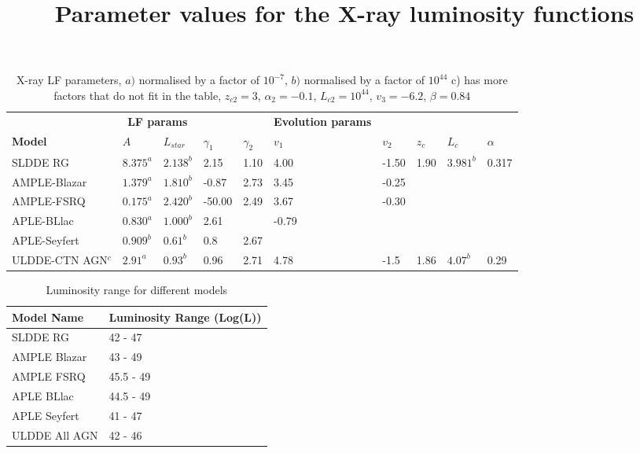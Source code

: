 \documentclass{article}
\begin{document}
\begin{table}
\centering
\title{Parameter values for the X-ray luminosity functions}
\begin{tabularx}{\textwidth}{|l|XXXX|XXXXX|}
\hline

& \multicolumn{2}{c}{\textbf{LF params}} &&&  \textbf{Evolution params} &&&&\\

\textbf{Model} & $A$ & $L_{star}$ & $\gamma _1$ &  $\gamma _2$  & $v_1$ & $v_2$ & $z_c$ & $L_c$ & $ \alpha$\\
\hline
SLDDE RG & $8.375^a$ & $2.138^b$ & 2.15 & 1.10 & 4.00 & -1.50 & 1.90 & $3.981^b$ & 0.317  \\

AMPLE-Blazar & $1.379^a$ & $1.810^b$ & -0.87 & 2.73 & 3.45 & -0.25 & & &  \\

AMPLE-FSRQ & $0.175^a$ & $2.420^b$ & -50.00 & 2.49 & 3.67 & -0.30 & & &  \\

APLE-BLlac & $0.830^a$& $1.000^b$ & 2.61 & &-0.79& & & &  \\
APLE-Seyfert & $0.909^b$ & $0.61^b$ & 0.8 & 2.67& & & & &  \\
ULDDE-CTN AGN$^c$ & $2.91^a$ & $0.93^b$ & 0.96 & 2.71& 4.78 &-1.5 &1.86 &$4.07^b$ &0.29  \\
\hline
\end{tabularx}
\caption{X-ray LF parameters, $a)$ normalised by a factor of $10^{-7}$, $b)$ normalised by a factor of $10^{44}$
c) has more factors that do not fit in the table, $z_{c2} = 3$, $\alpha_2 =-0.1$, $L_{c2} = 10^{44}$, $v_3 = -6.2 $, $\beta=0.84$ }
\label{tab:xray_lf}
\end{table}

\begin{table}
    \centering
    \begin{tabular}{ll}
    \hline
     Model Name   & Luminosity Range (Log(L))  \\
    \hline
     SLDDE RG     & 42 - 47            \\
     AMPLE Blazar & 43 - 49          \\
     AMPLE FSRQ   & 45.5 - 49          \\
     APLE BLlac   & 44.5 - 49        \\
     APLE Seyfert & 41 - 47          \\
     ULDDE All AGN & 42 - 46 \\
    \hline

\end{tabular}
\caption{Luminosity range for different models}

\label{tab:lum_range}

\end{table}
\end{document}
